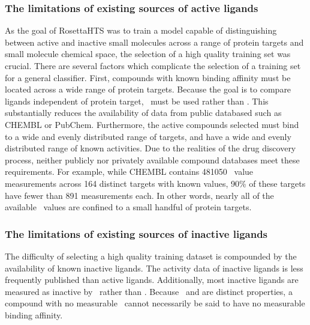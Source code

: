 \subsubsection{The limitations of existing sources of active ligands}
As the goal of RosettaHTS was to train a model capable of distinguishing between active and inactive small molecules across a range of protein targets and small molecule chemical space, the selection of a high quality training set was crucial.
There are several factors which complicate the selection of a training set for a general classifier.
First, compounds with known binding affinity must be located across a wide range of protein targets.
Because the goal is to compare ligands independent of protein target, \ki\ must be used rather than \ic.
This substantially reduces the availability of data from public databased such as CHEMBL or PubChem. 
Furthermore, the active compounds selected must bind to a wide and evenly distributed range of targets, and have a wide and evenly distributed range of known activities.
Due to the realities of the drug discovery process, neither publicly nor privately available compound databases meet these requirements.
For example, while CHEMBL contains 481050 \ki\ value measurements across 164 distinct targets with known \ki values, 90\% of these targets have fewer than 891 measurements each.
In other words, nearly all of the available \ki\ values are confined to a small handful of protein targets.

\subsubsection{The limitations of existing sources of inactive ligands}
The difficulty of selecting a high quality training dataset is compounded by the availability of known inactive ligands. 
The activity data of inactive ligands is less frequently published than active ligands.
Additionally, most inactive ligands are measured as inactive by \ic\ rather than \ki.
Because \ic\ and \ki are distinct properties, a compound with no measurable \ic\ cannot necessarily be said to have no measurable binding affinity.

